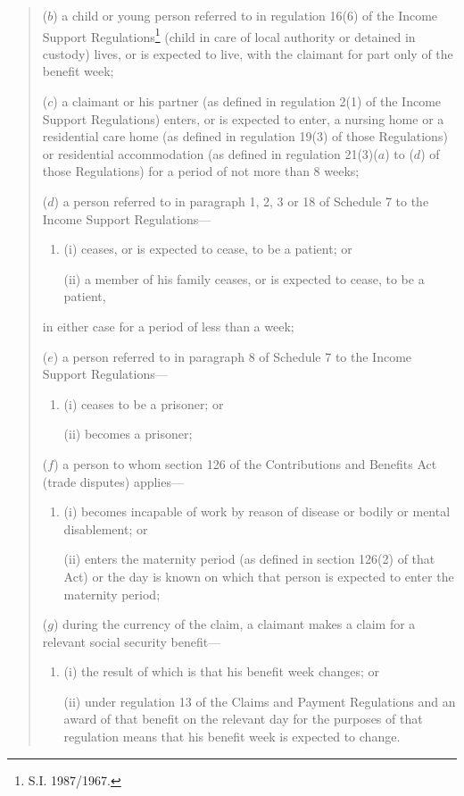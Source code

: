 \documentclass[12pt,a4paper]{article}
\begin{document}
\begin{quotation}
\begin{enumerate}
($b$) a child or young person referred to in regulation 16(6) of the Income Support Regulations\footnote{\frenchspacing S.I. 1987/1967.} (child in care of local authority or detained in custody) lives, or is expected to live, with the claimant for part only of the benefit week;

($c$) a claimant or his partner (as defined in regulation 2(1) of the Income Support Regulations) enters, or is expected to enter, a nursing home or a residential care home (as defined in regulation 19(3) of those Regulations) or residential accommodation (as defined in regulation 21(3)($a$)  to ($d$)  of those Regulations) for a period of not more than 8 weeks;

($d$) a person referred to in paragraph 1, 2, 3 or 18 of Schedule 7 to the Income Support Regulations—
\begin{enumerate}\item[]
(i) ceases, or is expected to cease, to be a patient; or

(ii) a member of his family ceases, or is expected to cease, to be a patient,
\end{enumerate}
in either case for a period of less than a week;

($e$) a person referred to in paragraph 8 of Schedule 7 to the Income Support Regulations—
\begin{enumerate}\item[]
(i) ceases to be a prisoner; or

(ii) becomes a prisoner;
\end{enumerate}

($f$) a person to whom section 126 of the Contributions and Benefits Act (trade disputes) applies—
\begin{enumerate}\item[]
(i) becomes incapable of work by reason of disease or bodily or mental disablement; or

(ii) enters the maternity period (as defined in section 126(2) of that Act) or the day is known on which that person is expected to enter the maternity period;
\end{enumerate}

($g$) during the currency of the claim, a claimant makes a claim for a relevant social security benefit—
\begin{enumerate}\item[]
(i) the result of which is that his benefit week changes; or

(ii) under regulation 13 of the Claims and Payment Regulations and an award of that benefit on the relevant day for the purposes of that regulation means that his benefit week is expected to change.
\end{enumerate}
\end{enumerate}


\end{quotation}
\end{document}
